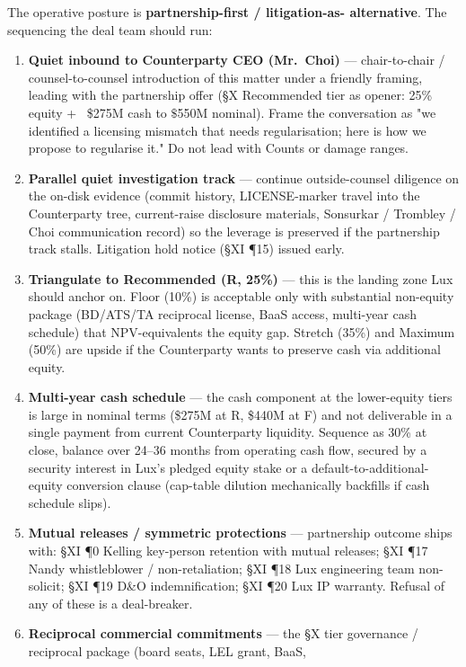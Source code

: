 \documentclass[11pt,letterpaper]{article}
\begin{document}
The operative posture is \textbf{partnership-first / litigation-as-
alternative}. The sequencing the deal team should run:

\begin{enumerate}[leftmargin=1.5em,itemsep=0.1em]
\item \textbf{Quiet inbound to Counterparty CEO (Mr.\ Choi)} ---
chair-to-chair / counsel-to-counsel introduction of this matter
under a friendly framing, leading with the partnership offer
(§X Recommended tier as opener: 25\% equity + ~\$275M cash to
$\$$550M nominal). Frame the conversation as "we identified a
licensing mismatch that needs regularisation; here is how we
propose to regularise it." Do not lead with Counts or damage
ranges.
\item \textbf{Parallel quiet investigation track} --- continue
outside-counsel diligence on the on-disk evidence (commit history,
LICENSE-marker travel into the Counterparty tree, current-raise
disclosure materials, Sonsurkar / Trombley / Choi communication
record) so the leverage is preserved if the partnership track
stalls. Litigation hold notice (§XI ¶15) issued early.
\item \textbf{Triangulate to Recommended (R, 25\%)} --- this is the
landing zone Lux should anchor on. Floor (10\%) is acceptable only
with substantial non-equity package (BD/ATS/TA reciprocal license,
BaaS access, multi-year cash schedule) that NPV-equivalents the
equity gap. Stretch (35\%) and Maximum (50\%) are upside if the
Counterparty wants to preserve cash via additional equity.
\item \textbf{Multi-year cash schedule} --- the cash component at
the lower-equity tiers is large in nominal terms (\$275M at R,
\$440M at F) and not deliverable in a single payment from current
Counterparty liquidity. Sequence as 30\% at close, balance over
24--36 months from operating cash flow, secured by a security
interest in Lux's pledged equity stake or a default-to-additional-
equity conversion clause (cap-table dilution mechanically
backfills if cash schedule slips).
\item \textbf{Mutual releases / symmetric protections} ---
partnership outcome ships with: §XI ¶0 Kelling key-person
retention with mutual releases; §XI ¶17 Nandy whistleblower /
non-retaliation; §XI ¶18 Lux engineering team non-solicit; §XI
¶19 D\&O indemnification; §XI ¶20 Lux IP warranty. Refusal of
any of these is a deal-breaker.
\item \textbf{Reciprocal commercial commitments} --- the §X tier
governance / reciprocal package (board seats, LEL grant, BaaS,

\end{enumerate}
\end{document}

